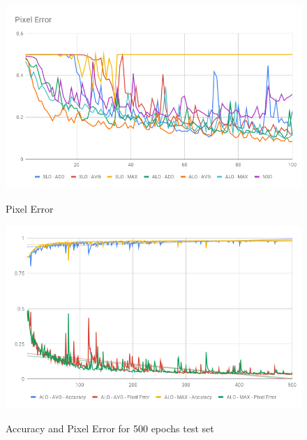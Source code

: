 \begin{figure}
  \caption{Pixel Error}
  \centering
  \includegraphics[width=1.\columnwidth]{figures/falreis/pixel_error.png}\label{fig:pixel_error}
\end{figure}

\begin{figure}
  \caption{Accuracy and Pixel Error for 500 epochs test set}
  \centering
  \includegraphics[width=1.\columnwidth]{figures/falreis/val_acc_500_epochs.png}\label{fig:val_acc_500_epochs}
\end{figure}




